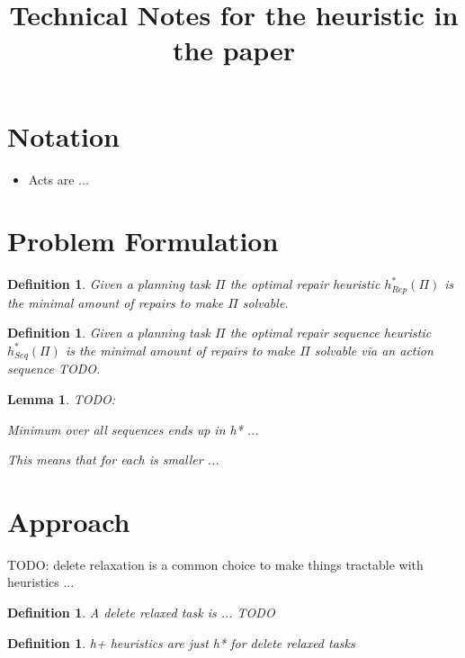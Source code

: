 \documentclass[twocolumn]{article}
\title{Technical Notes for the heuristic in the paper}
\newcommand{\task}{\ensuremath{\Pi}\xspace}
\newcommand{\optimalHeuristic}{\ensuremath{h^{*}_{Rep}}\xspace}
\newcommand{\optimalHeuristicSeq}{\ensuremath{h^{*}_{Seq}}\xspace}
\newtheorem{lemma}[theorem]{Lemma}
\newtheorem{definition}[theorem]{Definition}
\begin{document}
	
	\maketitle
	
	\section{Notation}
	
	\begin{itemize}
		\item Acts are ...
	\end{itemize}
	
	
	\section{Problem Formulation}
	
	\begin{definition}
		Given a planning task \task the optimal repair heuristic $\optimalHeuristic(\task)$ is the minimal amount of repairs to make \task solvable.
	\end{definition}
	
	\begin{definition}
		Given a planning task \task the optimal repair sequence heuristic $\optimalHeuristicSeq(\task)$ is the minimal amount of repairs to make \task solvable via an action sequence TODO.
	\end{definition}
	
	\begin{lemma}
		TODO:
		
		Minimum over all sequences ends up in h* ...
		
		This means that for each is smaller ...
	\end{lemma}
	
	\section{Approach}
	
	TODO: delete relaxation is a common choice to make things tractable with heuristics ...
	
	\begin{definition}
		A delete relaxed task is ... TODO
	\end{definition}
	
	\begin{definition}
		h+ heuristics are just h* for delete relaxed tasks
	\end{definition}
	
\end{document}
